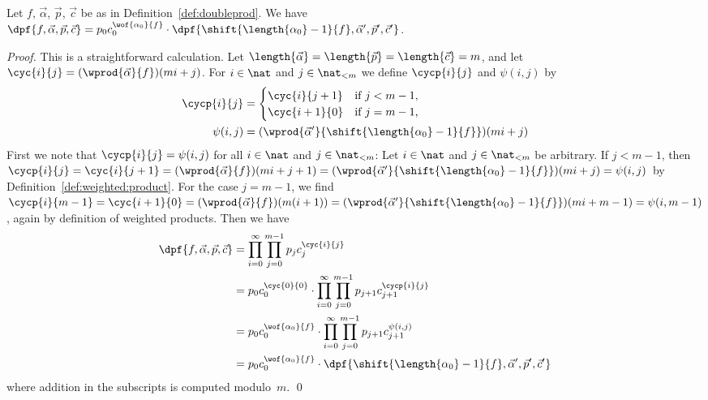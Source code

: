 \begin{lemma}\label{lem:doubleprod:rotation}
  Let $f$, $\vec{\alpha}$, $\vec{p}$, $\vec{c}$ be as in Definition~\ref{def:doubleprod}. 
  We have
  $\dpf{f,\vec{\alpha},\vec{p},\vec{c}} = 
  p_0 c_0^{\wof{\alpha_0}{f}} \cdot \dpf{\shift{\length{\alpha_0}-1}{f},\vec{\alpha}',\vec{p}',\vec{c}'}$.
\end{lemma}
\begin{proof}This is a straightforward calculation.
  Let $\length{\vec{\alpha}} = \length{\vec{p}} = \length{\vec{c}} = m$,
  and let $\cyc{i}{j} = (\wprod{\vec{\alpha}}{f})(mi+j)$.
For $i \in \nat$ and $j \in \nat_{<m}$ we define $\cycp{i}{j}$ and $\psi(i,j)$ by
  \begin{align*}
    \cycp{i}{j} &= 
    \begin{cases}
      \cyc{i}{j+1} & \text{if $j < m-1$,} \\
      \cyc{i+1}{0} & \text{if $j = m-1$,}
    \end{cases}
    \\
    \psi(i,j) & = (\wprod{\vec{\alpha}'}{\shift{\length{\alpha_0} - 1}{f}})(mi+j)
  \end{align*}
  First we note that $\cycp{i}{j} = \psi(i,j)$ for all $i \in \nat$ and $j \in \nat_{<m}$:
  Let $i \in \nat$ and $j \in \nat_{<m}$ be arbitrary.
  If $j < m - 1$, then 
  $\cycp{i}{j} = \cyc{i}{j+1} = (\wprod{\vec{\alpha}}{f})(mi+j+1) 
  = (\wprod{\vec{\alpha}'}{\shift{\length{\alpha_0} - 1}{f}})(mi+j) = \psi(i,j)$ by Definition~\ref{def:weighted:product}.
  For the case $j = m - 1$, we find 
  $\cycp{i}{m-1} = \cyc{i+1}{0} = (\wprod{\vec{\alpha}}{f})(m(i+1)) 
  = (\wprod{\vec{\alpha}'}{\shift{\length{\alpha_0} - 1}{f}})(mi+m-1) = \psi(i,m-1)$, 
  again by definition of weighted products. Then we have
  \begin{align*}
    \dpf{f,\vec{\alpha},\vec{p},\vec{c}} 
    & = \prod_{i=0}^\infty \prod_{j=0}^{m-1} p_j c_j^{\cyc{i}{j}} \\
& = p_0 c_0^{\cyc{0}{0}} \cdot \prod_{i=0}^\infty \prod_{j=0}^{m-1} p_{j+1} c_{j+1}^{\cycp{i}{j}} \\
    & = p_0 c_0^{\wof{\alpha_0}{f}} \cdot \prod_{i=0}^\infty \prod_{j=0}^{m-1} p_{j+1} c_{j+1}^{\psi(i,j)} \\
    & = p_0 c_0^{\wof{\alpha_0}{f}} \cdot \dpf{\shift{\length{\alpha_0}-1}{f},\vec{\alpha}',\vec{p}',\vec{c}'}
  \end{align*}
  where addition in the subscripts is computed modulo~$m$.
  \qed
\end{proof}


